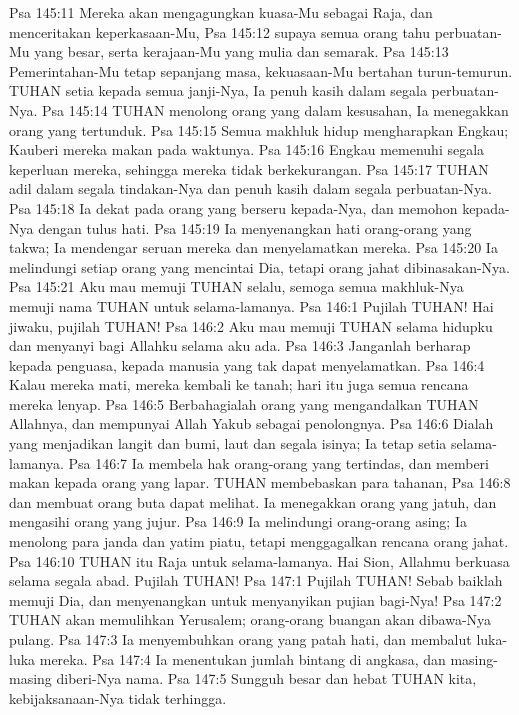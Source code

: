 Psa 145:11  Mereka akan mengagungkan kuasa-Mu sebagai Raja, dan menceritakan keperkasaan-Mu,
Psa 145:12  supaya semua orang tahu perbuatan-Mu yang besar, serta kerajaan-Mu yang mulia dan semarak.
Psa 145:13  Pemerintahan-Mu tetap sepanjang masa, kekuasaan-Mu bertahan turun-temurun. TUHAN setia kepada semua janji-Nya, Ia penuh kasih dalam segala perbuatan-Nya.
Psa 145:14  TUHAN menolong orang yang dalam kesusahan, Ia menegakkan orang yang tertunduk.
Psa 145:15  Semua makhluk hidup mengharapkan Engkau; Kauberi mereka makan pada waktunya.
Psa 145:16  Engkau memenuhi segala keperluan mereka, sehingga mereka tidak berkekurangan.
Psa 145:17  TUHAN adil dalam segala tindakan-Nya dan penuh kasih dalam segala perbuatan-Nya.
Psa 145:18  Ia dekat pada orang yang berseru kepada-Nya, dan memohon kepada-Nya dengan tulus hati.
Psa 145:19  Ia menyenangkan hati orang-orang yang takwa; Ia mendengar seruan mereka dan menyelamatkan mereka.
Psa 145:20  Ia melindungi setiap orang yang mencintai Dia, tetapi orang jahat dibinasakan-Nya.
Psa 145:21  Aku mau memuji TUHAN selalu, semoga semua makhluk-Nya memuji nama TUHAN untuk selama-lamanya.
Psa 146:1  Pujilah TUHAN! Hai jiwaku, pujilah TUHAN!
Psa 146:2  Aku mau memuji TUHAN selama hidupku dan menyanyi bagi Allahku selama aku ada.
Psa 146:3  Janganlah berharap kepada penguasa, kepada manusia yang tak dapat menyelamatkan.
Psa 146:4  Kalau mereka mati, mereka kembali ke tanah; hari itu juga semua rencana mereka lenyap.
Psa 146:5  Berbahagialah orang yang mengandalkan TUHAN Allahnya, dan mempunyai Allah Yakub sebagai penolongnya.
Psa 146:6  Dialah yang menjadikan langit dan bumi, laut dan segala isinya; Ia tetap setia selama-lamanya.
Psa 146:7  Ia membela hak orang-orang yang tertindas, dan memberi makan kepada orang yang lapar. TUHAN membebaskan para tahanan,
Psa 146:8  dan membuat orang buta dapat melihat. Ia menegakkan orang yang jatuh, dan mengasihi orang yang jujur.
Psa 146:9  Ia melindungi orang-orang asing; Ia menolong para janda dan yatim piatu, tetapi menggagalkan rencana orang jahat.
Psa 146:10  TUHAN itu Raja untuk selama-lamanya. Hai Sion, Allahmu berkuasa selama segala abad. Pujilah TUHAN!
Psa 147:1  Pujilah TUHAN! Sebab baiklah memuji Dia, dan menyenangkan untuk menyanyikan pujian bagi-Nya!
Psa 147:2  TUHAN akan memulihkan Yerusalem; orang-orang buangan akan dibawa-Nya pulang.
Psa 147:3  Ia menyembuhkan orang yang patah hati, dan membalut luka-luka mereka.
Psa 147:4  Ia menentukan jumlah bintang di angkasa, dan masing-masing diberi-Nya nama.
Psa 147:5  Sungguh besar dan hebat TUHAN kita, kebijaksanaan-Nya tidak terhingga.
